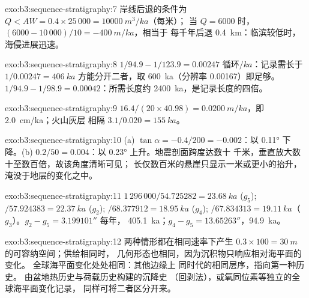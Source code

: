\begin{solution}{exo:b3:sequence-stratigraphy:7}
岸线后退的条件为 $Q < AW = 0.4\times25\,000 = \qty{10000}{m^3/ka}$（每米）；
当 $Q = 6000$ 时，$(6000 - 10\,000)/10 = \qty{-400}{m/ka}$，相当于
每千年后退 \qty{0.4}{km}：临滨较低时，
海侵进展迅速。
\end{solution}

\begin{solution}{exo:b3:sequence-stratigraphy:8}
$1/94.9 - 1/123.9 = \num{0.00247}\text{ 循环}/\unit{ka}$：记录需长于
$1/0.00247 = \qty{406}{ka}$ 方能分开二者，取 \qty{600}{ka}（分辨率
0.00167）即足够。$1/94.9 - 1/98.9 = 0.00042$：所需长度约
\qty{2400}{ka}，是记录长度的四倍。
\end{solution}

\begin{solution}{exo:b3:sequence-stratigraphy:9}
$16.4/(20\times40.98) = \qty{0.0200}{m/ka}$，即 \qty{2.0}{cm/ka}；火山灰层
相隔 $3.1/0.020 = \qty{155}{ka}$。
\end{solution}

\begin{solution}{exo:b3:sequence-stratigraphy:10}
(a) $\tan\alpha = -0.4/200 = -0.002$：以 \ang{0.11} 下降。(b)
$0.2/50 = 0.004$：以 \ang{0.23} 上升。地震剖面跨度达数十
千米，垂直放大数十至数百倍，故该角度清晰可见；
长仅数百米的悬崖只显示一米或更小的抬升，
淹没于地层的变化之中。
\end{solution}

\begin{solution}{exo:b3:sequence-stratigraphy:11}
$1\,296\,000/54.725282 = \qty{23.68}{ka}$ ($g_5$); $/57.924383 =
\qty{22.37}{ka}$ ($g_2$); $/68.377912 = \qty{18.95}{ka}$ ($g_4$);
$/67.834313 = \qty{19.11}{ka}$（$g_3$）。$g_2 - g_5 = 3.199101''$ 每年，
\qty{405.1}{ka}；$g_4 - g_5 = 13.65263''$，\qty{94.9}{ka}。
\end{solution}

\begin{solution}{exo:b3:sequence-stratigraphy:12}
两种情形都在相同速率下产生 $0.3\times100 = \qty{30}{m}$ 的可容纳空间；供给相同时，
几何形态也相同，因为沉积物只响应相对海平面的变化。
全球海平面变化处处相同：其他边缘上
同时代的相同层序，指向第一种历史。
由盆地热历史与荷载历史构建的沉降史
（回剥法），或氧同位素等独立的全球海平面变化记录，
同样可将二者区分开来。
\end{solution}

